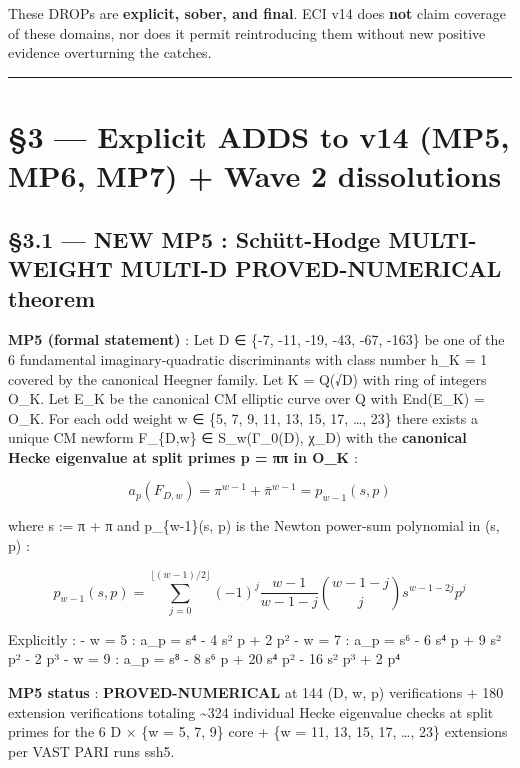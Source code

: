 \documentclass[
  11pt,
  a4paper,
]{article}
\begin{document}
These DROPs are \textbf{explicit, sober, and final}. ECI v14 does \textbf{not} claim coverage of these domains, nor does it permit reintroducing them without new positive evidence overturning the catches.

\begin{center}\rule{0.5\linewidth}{0.5pt}\end{center}

\hypertarget{explicit-adds-to-v14-mp5-mp6-mp7-wave-2-dissolutions}{%
\section{§3 --- Explicit ADDS to v14 (MP5, MP6, MP7) + Wave 2 dissolutions}\label{explicit-adds-to-v14-mp5-mp6-mp7-wave-2-dissolutions}}

\hypertarget{new-mp5-schuxfctt-hodge-multi-weight-multi-d-proved-numerical-theorem}{%
\subsection{§3.1 --- NEW MP5 : Schütt-Hodge MULTI-WEIGHT MULTI-D PROVED-NUMERICAL theorem}\label{new-mp5-schuxfctt-hodge-multi-weight-multi-d-proved-numerical-theorem}}

\textbf{MP5 (formal statement)} : Let D ∈ \{-7, -11, -19, -43, -67, -163\} be one of the 6 fundamental imaginary-quadratic discriminants with class number h\_K = 1 covered by the canonical Heegner family. Let K = Q(√D) with ring of integers O\_K. Let E\_K be the canonical CM elliptic curve over Q with End(E\_K) = O\_K. For each odd weight w ∈ \{5, 7, 9, 11, 13, 15, 17, \ldots, 23\} there exists a unique CM newform F\_\{D,w\} ∈ S\_w(Γ\_0(\textbar D\textbar), χ\_D) with the \textbf{canonical Hecke eigenvalue at split primes p = ππ in O\_K} :

\[
a_p(F_{D,w}) = \pi^{w-1} + \bar\pi^{w-1} = p_{w-1}(s, p)
\]

where s := π + π and p\_\{w-1\}(s, p) is the Newton power-sum polynomial in (s, p) :

\[
p_{w-1}(s, p) = \sum_{j=0}^{\lfloor (w-1)/2 \rfloor} (-1)^j \frac{w-1}{w-1-j} \binom{w-1-j}{j} s^{w-1-2j} p^j
\]

Explicitly :
- w = 5 : a\_p = s⁴ - 4 s² p + 2 p²
- w = 7 : a\_p = s⁶ - 6 s⁴ p + 9 s² p² - 2 p³
- w = 9 : a\_p = s⁸ - 8 s⁶ p + 20 s⁴ p² - 16 s² p³ + 2 p⁴

\textbf{MP5 status} : \textbf{PROVED-NUMERICAL} at 144 (D, w, p) verifications + 180 extension verifications totaling \textasciitilde324 individual Hecke eigenvalue checks at split primes for the 6 D × \{w = 5, 7, 9\} core + \{w = 11, 13, 15, 17, \ldots, 23\} extensions per VAST PARI runs ssh5.
\end{document}

